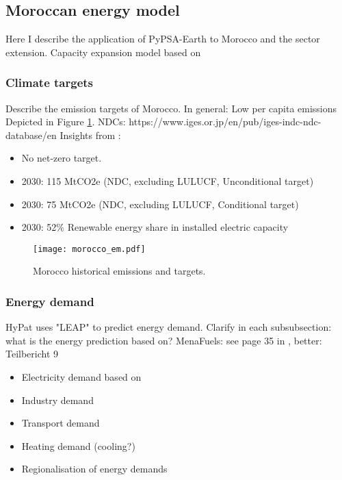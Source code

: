 
\subsection{Moroccan energy model}
\label{subsec:moroccan_model}
Here I describe the application of PyPSA-Earth \cite{Parzen2022} to Morocco and the sector extension.
Capacity expansion model based on \cite{Brown2018}


\subsubsection{Climate targets}
Describe the emission targets of Morocco. In general: Low per capita emissions
Depicted in Figure \ref{fig:morocco_em}.
NDCs: https://www.iges.or.jp/en/pub/iges-indc-ndc-database/en 
Insights from \cite{CAT2021}:
\begin{itemize}
    \item No net-zero target.
    \item 2030: 115 MtCO2e (NDC, excluding LULUCF, Unconditional target)
    \item 2030: 75 MtCO2e (NDC, excluding LULUCF, Conditional target)
    \item 2030: 52\% Renewable energy share in installed electric capacity
\end{itemize}

\begin{figure}[h!]
    \centering
    \texttt{[image: morocco\_em.pdf]}
    \caption{Morocco historical emissions and targets.}
    \label{fig:morocco_em}
\end{figure}


\subsubsection{Energy demand}
HyPat uses "LEAP" to predict energy demand.
Clarify in each subsubsection: what is the energy prediction based on?
MenaFuels: see page 35 in \cite{Ersoy2022}, better: Teilbericht 9
\begin{itemize}
    \item Electricity demand based on \cite{Parzen2022}
    \item Industry demand
    \item Transport demand
    \item Heating demand (cooling?) 
    \item Regionalisation of energy demands
\end{itemize}


